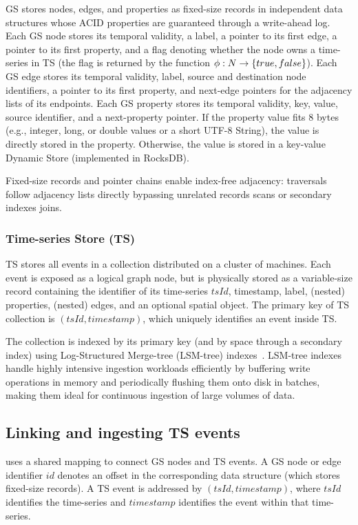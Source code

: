 GS stores nodes, edges, and properties as fixed-size records in independent data structures whose ACID properties are guaranteed through a write-ahead log.
Each GS node stores its temporal validity, a label, a pointer to its first edge, a pointer to its first property, and a flag denoting whether the node owns a time-series in TS (the flag is returned by the function $\phi: N \rightarrow \{true, false\}$).
Each GS edge stores its temporal validity, label, source and destination node identifiers, a pointer to its first property, and next-edge pointers for the adjacency lists of its endpoints.
Each GS property stores its temporal validity, key, value, source identifier, and a next-property pointer.
If the property value fits 8 bytes (e.g., integer, long, or double values or a short UTF-8 String), the value is directly stored in the property.
Otherwise, the value is stored in a key-value Dynamic Store (implemented in RocksDB). %

Fixed-size records and pointer chains enable index-free adjacency: traversals follow adjacency lists directly bypassing unrelated records scans or secondary indexes joins.

\subsubsection{Time-series Store (TS)}

TS stores all events in a collection distributed on a cluster of machines.
Each event is exposed as a logical graph node, but is physically stored as a variable-size record containing the identifier of its time-series $tsId$, timestamp, label, (nested) properties, (nested) edges, and an optional spatial object.
The primary key of TS collection is $(tsId,timestamp)$, which uniquely identifies an event inside TS.

The collection is indexed by its primary key (and by space through a secondary index) using Log-Structured Merge-tree (LSM-tree) indexes~\cite{DBLP:journals/acta/ONeilCGO96}.
LSM-tree indexes handle highly intensive ingestion workloads efficiently by buffering write operations in memory and periodically flushing them onto disk in batches, making them ideal for continuous ingestion of large volumes of data.

\subsection{Linking and ingesting TS events}
\ourapproach uses a shared mapping to connect GS nodes and TS events.
A GS node or edge identifier $id$ denotes an offset in the corresponding data structure (which stores fixed-size records).
A TS event is addressed by $(tsId,timestamp)$, where $tsId$ identifies the time-series and $timestamp$ identifies the event within that time-series.

